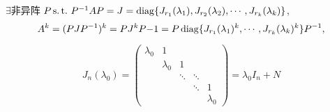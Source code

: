 \begin{solution}
  $\exists$非异阵
  $P \operatorname{s.t.{}} P^{-1}AP=J=\operatorname{diag}\{J_{r_1}(\lambda_1),J_{r_2}(\lambda_2),
    \cdots,J_{r_k}(\lambda_k)\}$,
    \begin{equation}\label{eq:JDapp4}
      A^k = (PJP^{-1})^k=PJ^kP{-1} =
      P\operatorname{diag} \{J_{r_1}(\lambda_1)^k, \cdots, J_{r_k}(\lambda_k)^k \}P^{-1},
    \end{equation}

    \begin{equation}\label{eq:JDapp5}
      J_n(\lambda_0) =
      \begin{pmatrix}
        \lambda_0&1&&&\\
                 &\lambda_0&1&&\\
                 &&\ddots&\ddots&\\
                 &&&\ddots&1\\
        &&&&\lambda_0
      \end{pmatrix} = \lambda_0 I_n + N
    \end{equation}


\end{solution}

